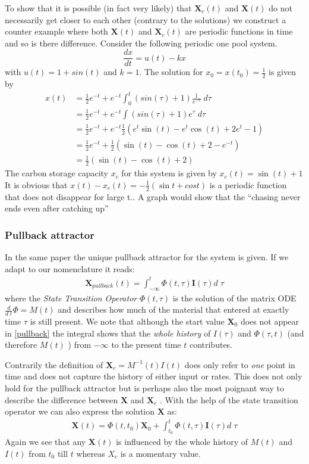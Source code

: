 \documentclass[journal abbreviation, manuscript]{copernicus}
\theoremstyle{definition}
\newcommand{\X}{\mathbf{X}}
\newcommand{\I}{\mathbf{I}}
\begin{document}
To show that it is possible (in fact very likely) that $\X_c(t)$ and $\X(t)$ do not necessarily get closer to each other (contrary to the solutions) we construct a counter example where both $\X(t)$ and $\X_c(t)$ are periodic functions in time and so is there difference.
Consider the following periodic one pool 
system.
$$
\frac{d x}{d t}=u(t)-kx
$$
with $u(t)=1+sin(t)$ and $k=1$.
The solution for $x_0=x(t_0)=\frac{1}{2}$ is given by 
\begin{align*}
x(t)  &=\frac{1}{2}e^{-t}+e^{-t} \int_{0}^{t} (sin(\tau)+1) \frac{1}{e^{-\tau}} \; d \tau 
      \\
      &=\frac{1}{2}e^{-t}+e^{-t} \int (sin(\tau)+1) e^{\tau} \; d \tau
      \\
      &=\frac{1}{2}e^{-t}+e^{-t} \frac{1}{2}(e^t \sin(t) - e^t \cos(t) + 2 e^t - 1 )
      \\
      &=\frac{1}{2}e^{-t}+\frac{1}{2}(\sin(t) - \cos(t) + 2 -  e^{-t}) 
      \\
      &=\frac{1}{2}(\sin(t) - \cos(t) + 2) 
\end{align*}
The carbon storage capacity $x_c$ for this system is given by $x_c(t)=\sin(t)+1$
It is obvious that $x(t)-x_c(t)= - \frac{1}{2}(\sin t +cos t)$ is a periodic function that does not disappear for large t..
{\color{red} A graph would show that the ``chasing never ends even after catching up''}

\subsubsection{Pullback attractor}
In the same paper the unique pullback attractor for the system is given. 
If we adapt to our nomenclature it reads:
\begin{align}
\label{pullback}
\X_{pullback}(t)=\int_{-\infty}^t \Phi(t,\tau) \I(\tau) d\;\tau 
\end{align}
where the \emph{State Transition Operator} $\Phi(t,\tau)$ is the solution of the matrix ODE $\frac{d}{d \;t} \Phi = M(t)$ and describes how much of the material that entered at exactly time $\tau$ is still present.
We note that although the start value $\X_0$ does not appear in \eqref{pullback} the integral shows that the \emph{whole history} of $I(\tau)$ and $\Phi(\tau,t)$ (and therefore $M(t)$ ) from $-\infty$ to the present time $t$ contributes.  

Contrarily the definition of $\X_c=M^{-1}(t) I(t)$ does only refer to \emph{one} point in time and does not capture the history of either input or rates. 
This does not only hold for the pullback attractor but is perhaps also the most poignant way to describe the difference between $\X$ and $\X_c$ .
With the help of the state transition operator we can also express the solution $\X$ as:
\begin{align}
\label{X_int}
\X(t)=\Phi(t,t_0)\X_0 + \int_{t_0}^t \Phi(t,\tau) \I(\tau) d\;\tau 
\end{align}
Again we see that any $\X(t)$ is influenced by the whole history of $M(t)$ and $I(t)$ from $t_0$ till $t$ whereas 
$X_c$ is a momentary value.
\end{document}
